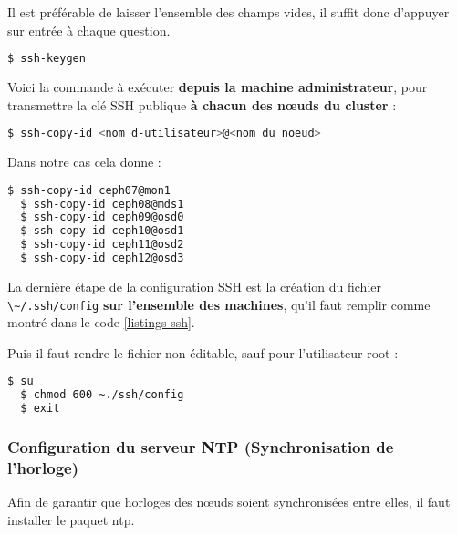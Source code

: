 \begin{WarningBox}
Il est préférable de laisser l'ensemble des champs vides, il suffit donc d'appuyer sur entrée à chaque question.
\end{WarningBox}

\vspace{3mm}
\begin{lstlisting}[language=bash]
  $ ssh-keygen
\end{lstlisting}

Voici la commande à exécuter \textbf{depuis la machine administrateur}, pour transmettre la clé SSH publique \textbf{à chacun des nœuds du cluster} :

\vspace{3mm}
\begin{lstlisting}[language=bash]
  $ ssh-copy-id <nom d-utilisateur>@<nom du noeud>
\end{lstlisting}

Dans notre cas cela donne :
\vspace{3mm}
\begin{lstlisting}[language=bash]
  $ ssh-copy-id ceph07@mon1
  $ ssh-copy-id ceph08@mds1
  $ ssh-copy-id ceph09@osd0
  $ ssh-copy-id ceph10@osd1
  $ ssh-copy-id ceph11@osd2
  $ ssh-copy-id ceph12@osd3
\end{lstlisting}

La dernière étape de la configuration SSH est la création du fichier \verb|\~/.ssh/config| \textbf{sur l'ensemble des machines}, qu'il faut remplir comme montré dans le code \ref{listings-ssh}.

\vspace{3mm}


Puis il faut rendre le fichier non éditable, sauf pour l’utilisateur root :

\vspace{3mm}
\begin{lstlisting}[language=bash]
  $ su
  $ chmod 600 ~./ssh/config
  $ exit
\end{lstlisting}


\subsubsection{Configuration du serveur NTP (Synchronisation de l'horloge)}
Afin de garantir que horloges des nœuds soient synchronisées entre elles, il faut installer le paquet ntp.

